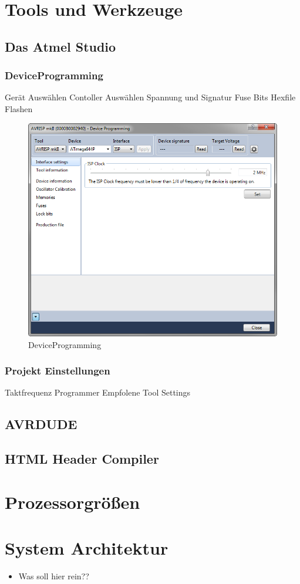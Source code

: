 \section{Tools und Werkzeuge}

\subsection{Das Atmel Studio}

\subsubsection{DeviceProgramming}

Gerät Auswählen
Contoller Auswählen
Spannung und Signatur
Fuse Bits
Hexfile Flashen

\begin{figure}[h]
\centering
\includegraphics[width=13cm]{content/pictures/Anleitung/neuerProzessor/AnleitungNeuerProzessor1.png}
\caption{DeviceProgramming}
\label{fig:B3}
\end{figure}

\subsubsection{Projekt Einstellungen}

Taktfrequenz
Programmer
Empfolene Tool Settings

\subsection{AVRDUDE}

\subsection{HTML Header Compiler}

\section{Prozessorgrößen}

\section{System Architektur}

\begin{itemize}
\item Was soll hier rein??
\end{itemize}

